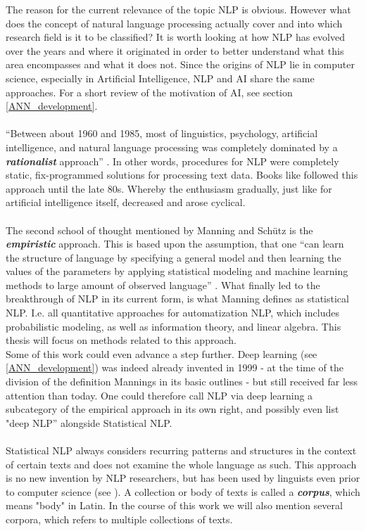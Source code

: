 \documentclass[11pt,a4paper]{article}
\begin{document}
The reason for the current relevance of the topic NLP is obvious. However	 what does the concept of natural language processing actually cover and into which research field is it to be classified? It is worth looking at how NLP has evolved over the years and where it originated in order to better understand what this area encompasses and what it does not. Since the origins of NLP lie in computer science, especially in Artificial Intelligence, NLP and AI share the same approaches. For a short review of the motivation of AI, see section \ref{ANN_development}.  \\
\ \\
“Between about 1960 and 1985, most of linguistics, psychology, artificial intelligence, and natural language processing was completely dominated by a \textbf{\textit{rationalist}} approach” \cite[p. 4]{Manning1999}. In other words, procedures for NLP were completely static, fix-programmed solutions for processing text data. Books like \cite{Noble1988} followed this approach until the late 80s. Whereby the enthusiasm gradually, just like for artificial intelligence itself, decreased and arose cyclical.\\
\ \\
The second school of thought mentioned by Manning and Schütz is the \textit{\textbf{empiristic}} approach.
This is based upon the assumption, that one “can learn the structure of language by specifying a general model and then learning the values of the parameters by applying statistical modeling and machine learning methods to large amount of observed language” \cite[p. 253]{Martinez2010}. What finally led to the breakthrough of NLP in its current form, is what Manning defines as statistical NLP. I.e. all quantitative approaches for automatization NLP, which includes probabilistic modeling, as well as information theory, and linear algebra. This thesis will focus on methods related to this approach.\\
Some of this work could even advance a step further. Deep learning (see \ref{ANN_development}) was indeed already invented in 1999 - at the time of the division of the definition Mannings in its basic outlines - but still received far less attention than today. One could therefore call NLP via deep learning a subcategory of the empirical approach in its own right, and possibly even list "deep NLP” alongside Statistical NLP.\\
\ \\
Statistical NLP always considers recurring patterns and structures in the context of certain texts and does not examine the whole language as such. This approach is no new invention by NLP researchers, but has been used by linguists even prior to computer science (see \cite{Harris1951}). A collection or body of texts is called a \textbf{\textit{corpus}}, which means "body" in Latin. In the course of this work we will also mention several corpora, which refers to multiple collections of texts.\\
\end{document}

